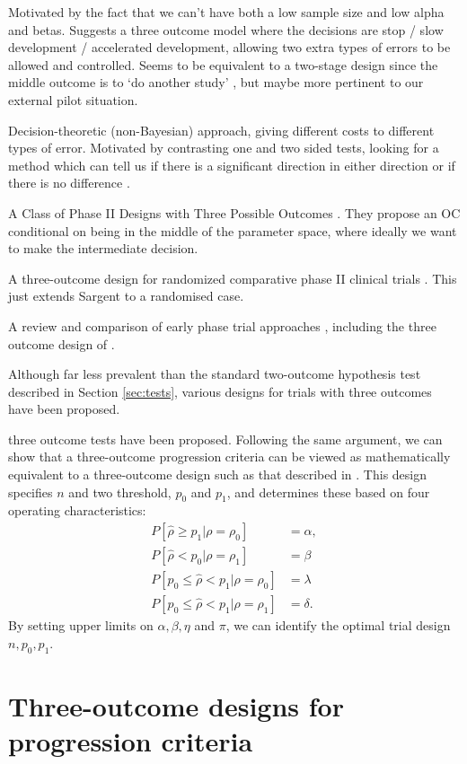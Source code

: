 \documentclass[sagev, Crown]{sagej} %
\begin{document}
Motivated by the fact that we can't have both a low sample size and low alpha and betas. Suggests a three outcome model where the decisions are stop / slow development / accelerated development, allowing two extra types of errors to be allowed and controlled. Seems to be equivalent to a two-stage design since the middle outcome is to `do another study' \cite{Brown2012}, but maybe more pertinent to our external pilot situation.

Decision-theoretic (non-Bayesian) approach, giving different costs to different types of error. Motivated by contrasting one and two sided tests, looking for a method which can tell us if there is a significant direction in either direction or if there is no difference \cite{Emerson1987}.

A Class of Phase II Designs with Three Possible Outcomes \cite{Storer1992}. They propose an OC conditional on being in the middle of the parameter space, where ideally we want to make the intermediate decision.

A three-outcome design for randomized comparative phase {II} clinical trials \cite{Hong2007}. This just extends Sargent to a randomised case.

A review and comparison of early phase trial approaches \cite{Kirby2016}, including the three outcome design of \cite{Brown2012}.

Although far less prevalent than the standard two-outcome hypothesis test described in Section \ref{sec:tests}, various designs for trials with three outcomes have been proposed.

three outcome tests have been proposed. Following the same argument, we can show that a three-outcome progression criteria can be viewed as mathematically equivalent to a three-outcome design such as that described in \cite{Sargent2001}. This design specifies $n$ and two threshold, $p_0$ and $p_1$, and determines these based on four operating characteristics:
\begin{align}
P[ \hat{\rho} \geq p_1 | \rho = \rho_0] & = \alpha, \\
P[ \hat{\rho} < p_0 | \rho = \rho_1] & = \beta \\
P[ p_0 \leq \hat{\rho} < p_1 | \rho = \rho_0] & = \lambda \\
P[ p_0 \leq \hat{\rho} < p_1 | \rho = \rho_1] & = \delta.
\end{align}
By setting upper limits on $\alpha, \beta, \eta$ and $\pi$, we can identify the optimal trial design $n, p_0, p_1$.

\section{Three-outcome designs for progression criteria}\label{sec:methods}
\end{document}
